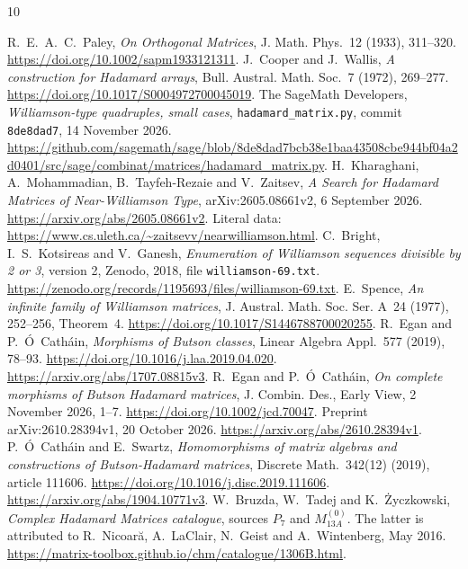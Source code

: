 \documentclass[10pt]{article}
\begin{document}
\begin{thebibliography}{10}\footnotesize\raggedright
\setlength{\itemsep}{0pt}\setlength{\parsep}{0pt}
R.~E.~A.~C.~Paley, \emph{On Orthogonal Matrices},
J. Math. Phys.\ 12 (1933), 311--320.
\url{https://doi.org/10.1002/sapm1933121311}.
J.~Cooper and J.~Wallis,
\emph{A construction for Hadamard arrays}, Bull. Austral. Math. Soc.\ 7 (1972), 269--277.
\url{https://doi.org/10.1017/S0004972700045019}.
The SageMath Developers, \emph{Williamson-type quadruples, small cases},
\texttt{hadamard\_matrix.py}, commit \texttt{8de8dad7}, 14 November 2026.
\url{https://github.com/sagemath/sage/blob/8de8dad7bcb38e1baa43508cbe944bf04a2d0401/src/sage/combinat/matrices/hadamard_matrix.py}.
H.~Kharaghani, A.~Mohammadian, B.~Tayfeh-Rezaie and V.~Zaitsev,
\emph{A Search for Hadamard Matrices of Near-Williamson Type},
arXiv:2605.08661v2, 6 September 2026.
\url{https://arxiv.org/abs/2605.08661v2}.
Literal data: \url{https://www.cs.uleth.ca/~zaitsevv/nearwilliamson.html}.
C.~Bright, I.~S.~Kotsireas and V.~Ganesh,
\emph{Enumeration of Williamson sequences divisible by 2 or 3},
version 2, Zenodo, 2018, file \texttt{williamson-69.txt}.
\url{https://zenodo.org/records/1195693/files/williamson-69.txt}.
E.~Spence, \emph{An infinite family of Williamson matrices},
J. Austral. Math. Soc. Ser. A\ 24 (1977), 252--256, Theorem~4.
\url{https://doi.org/10.1017/S1446788700020255}.
R.~Egan and P.~\'{O}~Cath\'ain,
\emph{Morphisms of Butson classes}, Linear Algebra Appl.\ 577 (2019), 78--93.
\url{https://doi.org/10.1016/j.laa.2019.04.020}.
\url{https://arxiv.org/abs/1707.08815v3}.
R.~Egan and P.~\'{O}~Cath\'ain,
\emph{On complete morphisms of Butson Hadamard matrices},
J. Combin. Des., Early View, 2 November 2026, 1--7.
\url{https://doi.org/10.1002/jcd.70047}.
Preprint arXiv:2610.28394v1, 20 October 2026.
\url{https://arxiv.org/abs/2610.28394v1}.
P.~\'{O}~Cath\'ain and E.~Swartz,
\emph{Homomorphisms of matrix algebras and constructions of Butson-Hadamard matrices},
Discrete Math.\ 342(12) (2019), article 111606.
\url{https://doi.org/10.1016/j.disc.2019.111606}.
\url{https://arxiv.org/abs/1904.10771v3}.
W.~Bruzda, W.~Tadej and K.~\.{Z}yczkowski,
\emph{Complex Hadamard Matrices catalogue}, sources $P_7$ and $M_{13A}^{(0)}$.
The latter is attributed to R.~Nicoar\u{a}, A.~LaClair, N.~Geist and
A.~Wintenberg, May 2016.
\url{https://matrix-toolbox.github.io/chm/catalogue/1306B.html}.

\end{thebibliography}
\end{document}
